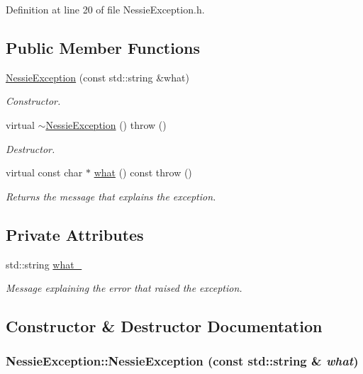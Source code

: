 Definition at line 20 of file NessieException.h.\subsection*{Public Member Functions}
\begin{CompactItemize}
\item 
\hyperlink{class_nessie_exception_80c86c892438045635bf6a99da17e859}{NessieException} (const std::string \&what)
\begin{CompactList}\small\item\em Constructor. \item\end{CompactList}\item 
virtual \hyperlink{class_nessie_exception_19f44d2725dd53e2f10505a88e5773f2}{$\sim$NessieException} ()  throw ()
\begin{CompactList}\small\item\em Destructor. \item\end{CompactList}\item 
virtual const char $\ast$ \hyperlink{class_nessie_exception_a522c2ea164e88be0b26670170b33909}{what} () const   throw ()
\begin{CompactList}\small\item\em Returns the message that explains the exception. \item\end{CompactList}\end{CompactItemize}
\subsection*{Private Attributes}
\begin{CompactItemize}
\item 
\hypertarget{class_nessie_exception_3464c36d30d9baabd0b10ac4797d4b5b}{
std::string \hyperlink{class_nessie_exception_3464c36d30d9baabd0b10ac4797d4b5b}{what\_\-}}
\label{class_nessie_exception_3464c36d30d9baabd0b10ac4797d4b5b}

\begin{CompactList}\small\item\em Message explaining the error that raised the exception. \item\end{CompactList}\end{CompactItemize}


\subsection{Constructor \& Destructor Documentation}
\hypertarget{class_nessie_exception_80c86c892438045635bf6a99da17e859}{
\subsubsection[NessieException]{\setlength{\rightskip}{0pt plus 5cm}NessieException::NessieException (const std::string \& {\em what})}}
\label{class_nessie_exception_80c86c892438045635bf6a99da17e859}


